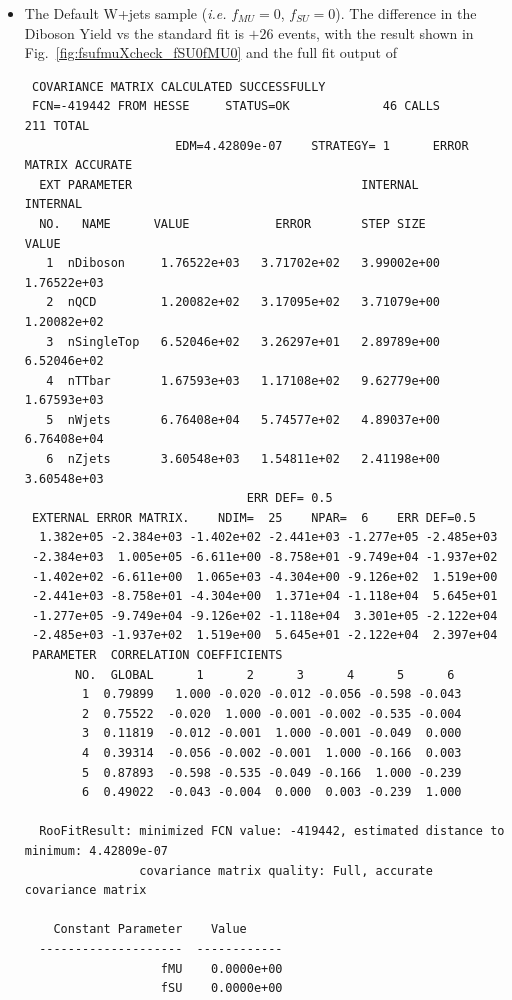 \begin{itemize}
\item The Default W+jets sample (\textit{i.e.} $f_{MU}=0$, $f_{SU}=0$). The difference in the Diboson Yield vs the standard fit is $+26$ events, with the result shown in Fig.~\ref{fig:fsufmuXcheck_fSU0fMU0} and the full fit output of
{\tiny
\begin{verbatim}
 COVARIANCE MATRIX CALCULATED SUCCESSFULLY
 FCN=-419442 FROM HESSE     STATUS=OK             46 CALLS         211 TOTAL
                     EDM=4.42809e-07    STRATEGY= 1      ERROR MATRIX ACCURATE 
  EXT PARAMETER                                INTERNAL      INTERNAL  
  NO.   NAME      VALUE            ERROR       STEP SIZE       VALUE   
   1  nDiboson     1.76522e+03   3.71702e+02   3.99002e+00   1.76522e+03
   2  nQCD         1.20082e+02   3.17095e+02   3.71079e+00   1.20082e+02
   3  nSingleTop   6.52046e+02   3.26297e+01   2.89789e+00   6.52046e+02
   4  nTTbar       1.67593e+03   1.17108e+02   9.62779e+00   1.67593e+03
   5  nWjets       6.76408e+04   5.74577e+02   4.89037e+00   6.76408e+04
   6  nZjets       3.60548e+03   1.54811e+02   2.41198e+00   3.60548e+03
                               ERR DEF= 0.5
 EXTERNAL ERROR MATRIX.    NDIM=  25    NPAR=  6    ERR DEF=0.5
  1.382e+05 -2.384e+03 -1.402e+02 -2.441e+03 -1.277e+05 -2.485e+03 
 -2.384e+03  1.005e+05 -6.611e+00 -8.758e+01 -9.749e+04 -1.937e+02 
 -1.402e+02 -6.611e+00  1.065e+03 -4.304e+00 -9.126e+02  1.519e+00 
 -2.441e+03 -8.758e+01 -4.304e+00  1.371e+04 -1.118e+04  5.645e+01 
 -1.277e+05 -9.749e+04 -9.126e+02 -1.118e+04  3.301e+05 -2.122e+04 
 -2.485e+03 -1.937e+02  1.519e+00  5.645e+01 -2.122e+04  2.397e+04 
 PARAMETER  CORRELATION COEFFICIENTS  
       NO.  GLOBAL      1      2      3      4      5      6
        1  0.79899   1.000 -0.020 -0.012 -0.056 -0.598 -0.043
        2  0.75522  -0.020  1.000 -0.001 -0.002 -0.535 -0.004
        3  0.11819  -0.012 -0.001  1.000 -0.001 -0.049  0.000
        4  0.39314  -0.056 -0.002 -0.001  1.000 -0.166  0.003
        5  0.87893  -0.598 -0.535 -0.049 -0.166  1.000 -0.239
        6  0.49022  -0.043 -0.004  0.000  0.003 -0.239  1.000

  RooFitResult: minimized FCN value: -419442, estimated distance to minimum: 4.42809e-07
                covariance matrix quality: Full, accurate covariance matrix

    Constant Parameter    Value     
  --------------------  ------------
                   fMU    0.0000e+00
                   fSU    0.0000e+00


\end{verbatim}}
\end{itemize}
